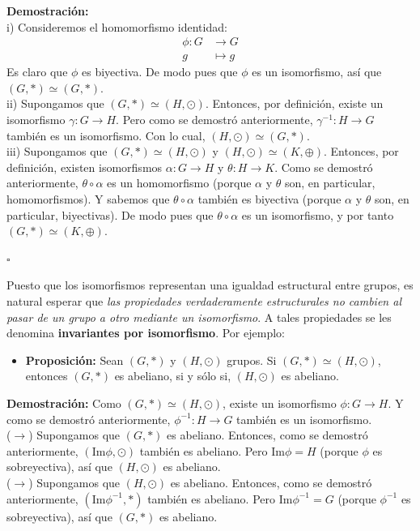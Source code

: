 \documentclass[10 pt]{article}
\begin{document}
\Large{\textbf{Demostración:} \\

i) Consideremos el homomorfismo identidad:
\begin{align*}
    \phi:G &\rightarrow G \\
    g &\mapsto g
\end{align*}
Es claro que $\phi$ es biyectiva. De modo pues que $\phi$ es un isomorfismo, así que $(G,*) \simeq (G,*)$. \\

ii) Supongamos que $(G,*) \simeq (H,\odot)$. Entonces, por definición, existe un isomorfismo $\gamma:G \rightarrow H$. Pero como se demostró anteriormente, $\gamma^{-1}:H \rightarrow G$ también es un isomorfismo. Con lo cual, $(H,\odot) \simeq (G,*)$. \\

iii) Supongamos que $(G,*) \simeq (H,\odot)$ y $(H,\odot) \simeq (K,\oplus)$. Entonces, por definición, existen isomorfismos $\alpha:G \rightarrow H$ y $\theta:H \rightarrow K$. Como se demostró anteriormente, $\theta \circ \alpha$ es un homomorfismo (porque $\alpha$ y $\theta$ son, en particular, homomorfismos). Y sabemos que $\theta \circ \alpha$ también es biyectiva (porque $\alpha$ y $\theta$ son, en particular, biyectivas). De modo pues que $\theta \circ \alpha$ es un isomorfismo, y por tanto $(G,*) \simeq (K,\oplus)$.}\\

\begin{flushright}
    $\square$
\end{flushright}

\Large{Puesto que los isomorfismos representan una igualdad estructural entre grupos, es natural esperar que \textit{las propiedades verdaderamente estructurales no cambien al pasar de un grupo a otro mediante un isomorfismo}. A tales propiedades se les denomina \textbf{invariantes por isomorfismo}. Por ejemplo:} \\

\begin{itemize}
    \item \Large{\textbf{Proposición:} Sean $(G,*)$ y $(H,\odot)$ grupos. Si $(G,*) \simeq (H,\odot)$, entonces $(G,*)$ es abeliano, si y sólo si, $(H,\odot)$ es abeliano.} \\
\end{itemize}

\Large{\textbf{Demostración:} Como $(G,*) \simeq (H,\odot)$, existe un isomorfismo $\phi:G \rightarrow H$. Y como se demostró anteriormente, $\phi^{-1}:H \rightarrow G$ también es un isomorfismo. \\

($\rightarrow$) Supongamos que $(G,*)$ es abeliano. Entonces, como se demostró anteriormente, $(\text{Im}\phi,\odot)$ también es abeliano. Pero $\text{Im}\phi=H$ (porque $\phi$ es sobreyectiva), así que $(H,\odot)$ es abeliano.  \\

($\rightarrow$) Supongamos que $(H,\odot)$ es abeliano. Entonces, como se demostró anteriormente, $(\text{Im}\phi^{-1},*)$ también es abeliano. Pero $\text{Im}\phi^{-1}=G$ (porque $\phi^{-1}$ es sobreyectiva), así que $(G,*)$ es abeliano.} \\
\end{document}
